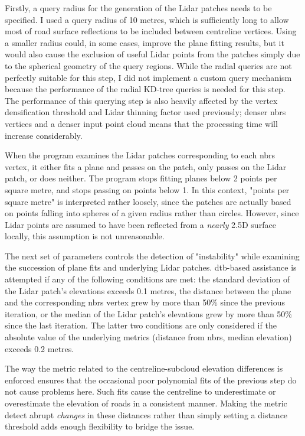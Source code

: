 Firstly, a query radius for the generation of the Lidar patches needs to be specified. I used a query radius of 10 metres, which is sufficiently long to allow most of road surface reflections to be included between centreline vertices. Using a smaller radius could, in some cases, improve the plane fitting results, but it would also cause the exclusion of useful Lidar points from the patches simply due to the spherical geometry of the query regions. While the radial queries are not perfectly suitable for this step, I did not implement a custom query mechanism because the performance of the radial KD-tree queries is needed for this step. The performance of this querying step is also heavily affected by the vertex densification threshold and Lidar thinning factor used previously; denser \ac{nbrs} vertices and a denser input point cloud means that the processing time will increase considerably.

When the program examines the Lidar patches corresponding to each \ac{nbrs} vertex, it either fits a plane and passes on the patch, only passes on the Lidar patch, or does neither. The program stops fitting planes below 2 points per square metre, and stops passing on points below 1. In this context, "points per square metre" is interpreted rather loosely, since the patches are actually based on points falling into spheres of a given radius rather than circles. However, since Lidar points are assumed to have been reflected from a \textit{nearly} 2.5D surface locally, this assumption is not unreasonable.

The next set of parameters controls the detection of "instability" while examining the succession of plane fits and underlying Lidar patches. \ac{dtb}-based assistance is attempted if any of the following conditions are met: the standard deviation of the Lidar patch's elevations exceeds 0.1 metres, the distance between the plane and the corresponding \ac{nbrs} vertex grew by more than 50\% since the previous iteration, or the median of the Lidar patch's elevations grew by more than 50\% since the last iteration. The latter two conditions are only considered if the absolute value of the underlying metrics (distance from \ac{nbrs}, median elevation) exceeds 0.2 metres.

The way the metric related to the centreline-subcloud elevation differences is enforced ensures that the occasional poor polynomial fits of the previous step do not cause problems here. Such fits cause the centreline to underestimate or overestimate the elevation of roads in a consistent manner. Making the metric detect abrupt \textit{changes} in these distances rather than simply setting a distance threshold adds enough flexibility to bridge the issue.

